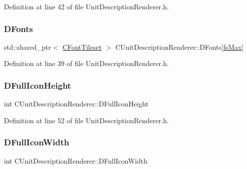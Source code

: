 Definition at line 42 of file Unit\+Description\+Renderer.\+h.

\hypertarget{classCUnitDescriptionRenderer_a270a545ecdb1602cd2a0a2def8997dc8}{}\label{classCUnitDescriptionRenderer_a270a545ecdb1602cd2a0a2def8997dc8} 
\subsubsection{\texorpdfstring{D\+Fonts}{DFonts}}
{\footnotesize\ttfamily std\+::shared\+\_\+ptr$<$ \hyperlink{classCFontTileset}{C\+Font\+Tileset} $>$ C\+Unit\+Description\+Renderer\+::\+D\+Fonts\mbox{[}\hyperlink{classCUnitDescriptionRenderer_a3ea4cd83b6dd9533ab3abb953a7da35aa74218e4708bac1eab359099eb0b159b2}{fs\+Max}\mbox{]}\hspace{0.3cm}{\ttfamily [protected]}}



Definition at line 39 of file Unit\+Description\+Renderer.\+h.

\hypertarget{classCUnitDescriptionRenderer_ae9f7d843d0eabd4b1f1b19bfa5332754}{}\label{classCUnitDescriptionRenderer_ae9f7d843d0eabd4b1f1b19bfa5332754} 
\subsubsection{\texorpdfstring{D\+Full\+Icon\+Height}{DFullIconHeight}}
{\footnotesize\ttfamily int C\+Unit\+Description\+Renderer\+::\+D\+Full\+Icon\+Height\hspace{0.3cm}{\ttfamily [protected]}}



Definition at line 52 of file Unit\+Description\+Renderer.\+h.

\hypertarget{classCUnitDescriptionRenderer_a4bd79032fe13b9c09386a24cb8ef7650}{}\label{classCUnitDescriptionRenderer_a4bd79032fe13b9c09386a24cb8ef7650} 
\subsubsection{\texorpdfstring{D\+Full\+Icon\+Width}{DFullIconWidth}}
{\footnotesize\ttfamily int C\+Unit\+Description\+Renderer\+::\+D\+Full\+Icon\+Width\hspace{0.3cm}{\ttfamily [protected]}}



